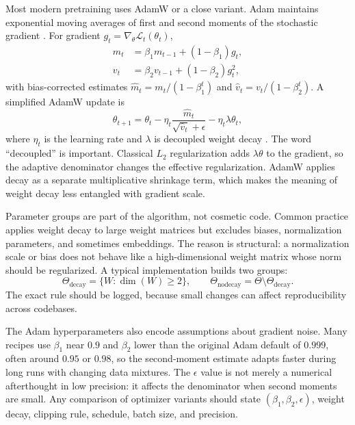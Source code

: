 Most modern \llm pretraining uses AdamW or a close variant. Adam maintains exponential moving averages of first and second moments of the stochastic gradient \cite{kingma2014adam}. For gradient $g_t = \nabla_{\theta}\mathcal{L}_t(\theta_t)$,
\begin{align}
  m_t &= \beta_1 m_{t-1} + (1-\beta_1)g_t, \\
  v_t &= \beta_2 v_{t-1} + (1-\beta_2)g_t^2,
\end{align}
with bias-corrected estimates $\hat{m}_t = m_t/(1-\beta_1^t)$ and $\hat{v}_t = v_t/(1-\beta_2^t)$. A simplified AdamW update is
\begin{equation}
  \theta_{t+1}
  =
  \theta_t
  - \eta_t
  \frac{\hat{m}_t}{\sqrt{\hat{v}_t}+\epsilon}
  - \eta_t \lambda \theta_t,
\end{equation}
where $\eta_t$ is the learning rate and $\lambda$ is decoupled weight decay \cite{loshchilov2019decoupled}. The word ``decoupled'' is important. Classical $L_2$ regularization adds $\lambda \theta$ to the gradient, so the adaptive denominator changes the effective regularization. AdamW applies decay as a separate multiplicative shrinkage term, which makes the meaning of weight decay less entangled with gradient scale.

Parameter groups are part of the algorithm, not cosmetic code. Common practice applies weight decay to large weight matrices but excludes biases, normalization parameters, and sometimes embeddings. The reason is structural: a normalization scale or bias does not behave like a high-dimensional weight matrix whose norm should be regularized. A typical implementation builds two groups:
\begin{equation}
  \Theta_{\mathrm{decay}} = \{W: \dim(W)\ge 2\}, \qquad
  \Theta_{\mathrm{nodecay}} = \Theta \setminus \Theta_{\mathrm{decay}}.
\end{equation}
The exact rule should be logged, because small changes can affect reproducibility across codebases.

The Adam hyperparameters also encode assumptions about gradient noise. Many \llm recipes use $\beta_1$ near $0.9$ and $\beta_2$ lower than the original Adam default of $0.999$, often around $0.95$ or $0.98$, so the second-moment estimate adapts faster during long runs with changing data mixtures. The $\epsilon$ value is not merely a numerical afterthought in low precision: it affects the denominator when second moments are small. Any comparison of optimizer variants should state $(\beta_1,\beta_2,\epsilon)$, weight decay, clipping rule, schedule, batch size, and precision.

